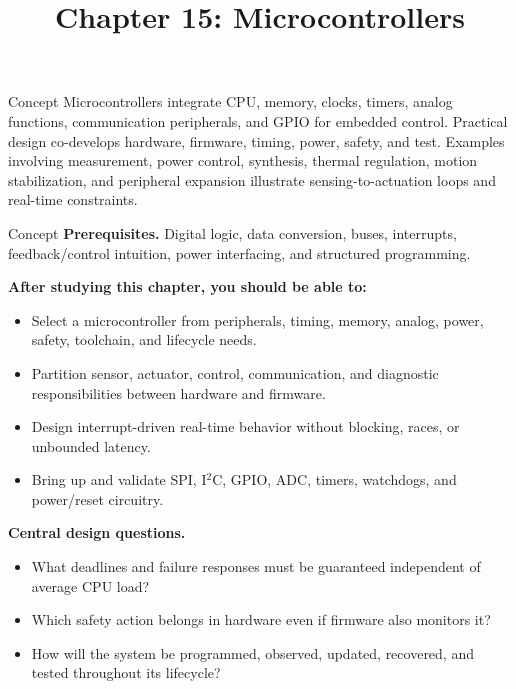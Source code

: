 \documentclass[10pt,letterpaper]{article}
\title{Chapter 15: Microcontrollers}
\author{}
\date{}
\begin{document}
\maketitle

\begin{CornellOverviewBox}{Concept}
Microcontrollers integrate CPU, memory, clocks, timers, analog functions, communication peripherals, and GPIO for embedded control. Practical design co-develops hardware, firmware, timing, power, safety, and test. Examples involving measurement, power control, synthesis, thermal regulation, motion stabilization, and peripheral expansion illustrate sensing-to-actuation loops and real-time constraints.
\end{CornellOverviewBox}
\begin{CornellOverviewBox}{Concept}
\textbf{Prerequisites.} Digital logic, data conversion, buses, interrupts, feedback/control intuition, power interfacing, and structured programming.

\textbf{After studying this chapter, you should be able to:}
\begin{itemize}
  \item Select a microcontroller from peripherals, timing, memory, analog, power, safety, toolchain, and lifecycle needs.
  \item Partition sensor, actuator, control, communication, and diagnostic responsibilities between hardware and firmware.
  \item Design interrupt-driven real-time behavior without blocking, races, or unbounded latency.
  \item Bring up and validate SPI, I$^2$C, GPIO, ADC, timers, watchdogs, and power/reset circuitry.
\end{itemize}\textbf{Central design questions.}
\begin{itemize}
  \item What deadlines and failure responses must be guaranteed independent of average CPU load?
  \item Which safety action belongs in hardware even if firmware also monitors it?
  \item How will the system be programmed, observed, updated, recovered, and tested throughout its lifecycle?
\end{itemize}\end{CornellOverviewBox}
\end{document}
